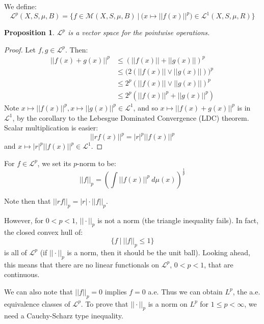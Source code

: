 \documentclass[a4paper,12pt]{report}
\newcommand{\ms}[1]{\mathscr{#1}}
\newtheorem{prop}[theorem]{Proposition}
\newenvironment{definition}[1][Definition.]{\begin{trivlist}
\item[\hskip \labelsep {\bfseries #1}]}{\end{trivlist}}
\newenvironment{remark}[1][Remark.]{\begin{trivlist}
\item[\hskip \labelsep {\bfseries #1}]}{\end{trivlist}}
\begin{document}
	\begin{definition}
	We define:
	\[ \ms{L}^p(X, S, \mu, B) = \bigg\{ f \in \ms{M}(X, S, \mu, B) ~\bigg|~ \big(x \mapsto ||f(x)||^p \big) \in \ms{L}^1(X, S, \mu, R) \bigg\} \]
	\end{definition}
	
	\begin{prop}
	$\ms{L}^p$ is a vector space for the pointwise operations. 
	\end{prop}
	\begin{proof}
	Let $f, g \in \ms{L}^p$. Then:
	\begin{align*} 
	||f(x) + g(x)||^p &\leq (||f(x)|| + ||g(x)||)^p \\
	&\leq \big( 2 (||f(x)|| \vee ||g(x)||)\big)^p \\
	&\leq 2^p (||f(x)|| \vee ||g(x)||)^p \\
	&\leq 2^p (||f(x)||^p + ||g(x)||^p)
	\end{align*}
	Note $x \mapsto ||f(x)||^p, x \mapsto ||g(x)||^p \in \ms{L}^1$, and so $x \mapsto ||f(x) + g(x)||^p$ is in $\ms{L}^1$, by the corollary to the Lebesgue Dominated Convergence (LDC) theorem. Scalar multiplication is easier:
	\[ ||rf(x)||^p = |r|^p||f(x)||^p \]
	and $x \mapsto |r|^p ||f(x)||^p \in \ms{L}^1$. 
	\end{proof}
	
	\begin{definition}
	For $f \in \ms{L}^p$, we set its $p$-norm to be:
	\[ ||f||_p = \left( \int ||f(x)||^p ~ d\mu(x) \right)^{\frac{1}{p}} \]
	\end{definition}
	
	\begin{remark}
	Note then that $||rf||_p = |r|\cdot ||f||_p$. 
	\end{remark}
	
	\noindent However, for $0 < p < 1$, $||\cdot||_p$ is not a norm (the triangle inequality fails). In fact, the closed convex hull of:
	\[ \{ f ~|~ ||f||_p \leq 1 \} \]
	is all of $\ms{L}^p$ (if $||\cdot||_p$ is a norm, then it should be the unit ball). Looking ahead, this means that there are no linear functionals on $\ms{L}^p$, $0 < p < 1$, that are continuous. 
	
	We can also note that $||f||_p = 0$ implies $f = 0$ a.e. Thus we can obtain $L^p$, the a.e. equivalence classes of $\ms{L}^p$. To prove that $||\cdot||_p$ is a norm on $L^p$ for $1 \leq p < \infty$, we need a Cauchy-Scharz type inequality.
	
\end{document}
